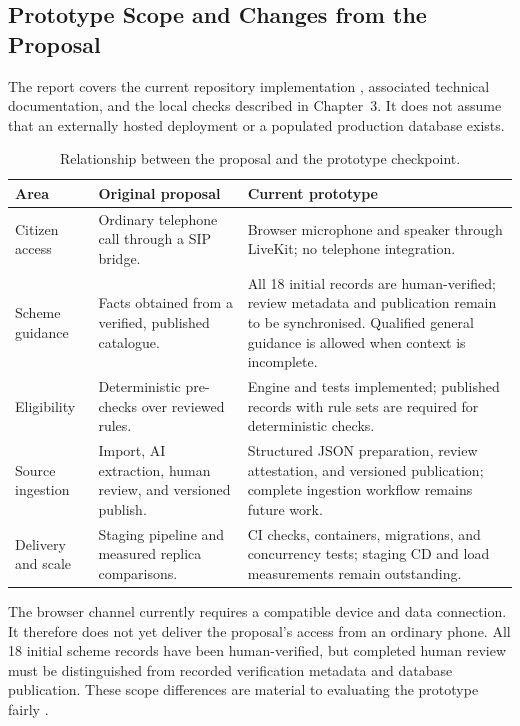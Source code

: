 \documentclass[11pt,a4paper,oneside]{report}
\begin{document}
\subsection{Prototype Scope and Changes from the Proposal}
The report covers the current repository implementation \cite{implementation},
associated technical documentation, and the local checks described in Chapter~3. It does not assume
that an externally hosted deployment or a populated production database exists.

\begin{table}[htbp]
\centering\small
\begin{tabularx}{\textwidth}{@{}P{0.23\textwidth}YY@{}}
\toprule
\textbf{Area} & \textbf{Original proposal} & \textbf{Current prototype} \\
\midrule
Citizen access & Ordinary telephone call through a SIP bridge.
  & Browser microphone and speaker through LiveKit; no telephone integration. \\
Scheme guidance & Facts obtained from a verified, published catalogue.
  & All 18 initial records are human-verified; review metadata and publication
    remain to be synchronised. Qualified general guidance is allowed when
    context is incomplete. \\
Eligibility & Deterministic pre-checks over reviewed rules.
  & Engine and tests implemented; published records with rule sets are required
    for deterministic checks. \\
Source ingestion & Import, AI extraction, human review, and versioned publish.
  & Structured JSON preparation, review attestation, and versioned publication;
    complete ingestion workflow remains future work. \\
Delivery and scale & Staging pipeline and measured replica comparisons.
  & CI checks, containers, migrations, and concurrency tests; staging CD and
    load measurements remain outstanding. \\
\bottomrule
\end{tabularx}
\caption{Relationship between the proposal and the prototype checkpoint.}
\label{tab:scope}
\end{table}

The browser channel currently requires a compatible device and data connection.
It therefore does not yet deliver the proposal's access from an ordinary phone.
All 18 initial scheme records have been human-verified, but completed human review
must be distinguished from recorded verification metadata and database publication.
These scope differences are material to evaluating
the prototype fairly \cite{architecture,voice-design}.
\end{document}
